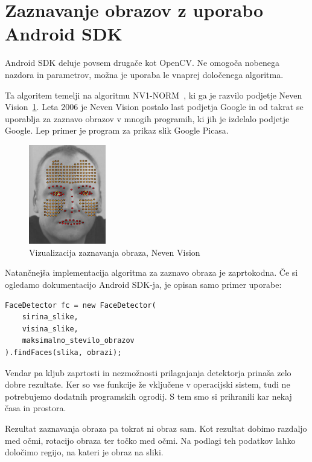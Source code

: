 \documentclass[a4paper, 12pt]{book}
\begin{document}
\section{Zaznavanje obrazov z uporabo Android SDK}
\label{sec:zaznavanjeObrazovAndroidSDK}
Android SDK deluje povsem drugače kot OpenCV. Ne omogoča nobenega nazdora in
parametrov, možna je uporaba le vnaprej določenega algoritma.

Ta algoritem temelji na algoritmu NV1-NORM~\cite{nevenFaceRecognition}, ki ga
je razvilo podjetje Neven Vision~\ref{fig:neven_vision}. Leta 2006 je Neven
Vision postalo last podjetja Google in od takrat se uporablja za zaznavo
obrazov v mnogih programih, ki jih je izdelalo podjetje Google. Lep  primer je
program za prikaz slik Google Picasa.

\begin{figure}[!ht]
    \centering
    \includegraphics[width=0.3\textwidth]{neven_vision}
    \caption{Vizualizacija zaznavanja obraza, Neven Vision}
    \label{fig:neven_vision}
\end{figure}

Natančnejša implementacija algoritma za zaznavo obraza je zaprtokodna. Če si
ogledamo dokumentacijo Android SDK-ja, je opisan samo primer uporabe:
\begin{lstlisting}[caption="Primer uporabe zaznavanja obraza z orodjem Android SDK"]
FaceDetector fc = new FaceDetector(
    sirina_slike,
    visina_slike,
    maksimalno_stevilo_obrazov
).findFaces(slika, obrazi);
\end{lstlisting}

Vendar pa kljub zaprtosti in nezmožnosti prilagajanja detektorja prinaša zelo
dobre rezultate. Ker so vse funkcije že vključene v operacijski sistem, tudi
ne potrebujemo dodatnih programskih ogrodij. S tem smo si prihranili kar nekaj
časa in prostora.

Rezultat zaznavanja obraza pa tokrat ni obraz sam. Kot rezultat dobimo
razdaljo med očmi, rotacijo obraza ter točko med očmi. Na podlagi teh podatkov
lahko določimo regijo, na kateri je obraz na sliki.
\end{document}
